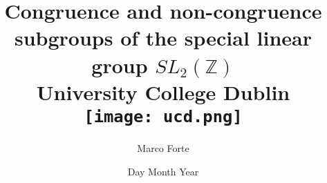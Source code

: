 \documentclass[12pt]{report}
\begin{document}
\title{
	{Congruence and non-congruence subgroups of the special linear group $SL_2(\mathbb{Z})$}\\
	{\large University College Dublin}\\
	{\texttt{[image: ucd.png]}}
}
\author{Marco Forte}
\date{Day Month Year}
\end{document}
